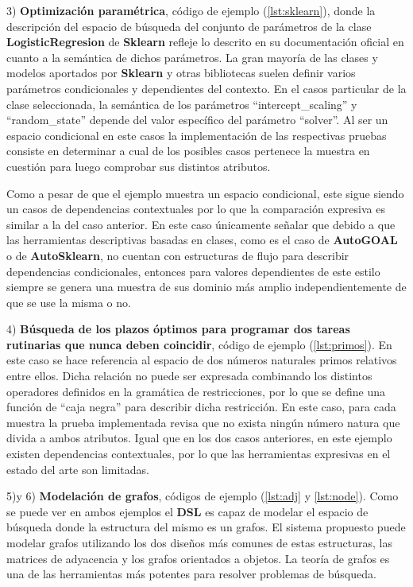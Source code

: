 3) {\bf Optimización paramétrica}, código de ejemplo (\ref{lst:sklearn}), donde la descripción del espacio de búsqueda del conjunto de parámetros de la clase
      {\bf LogisticRegresion} de {\bf Sklearn} refleje lo descrito en su documentación oficial en cuanto a la semántica de dichos
parámetros. La gran mayoría de las clases y modelos aportados por {\bf Sklearn} y otras bibliotecas suelen definir varios
parámetros condicionales y dependientes del contexto. En el casos particular de la clase seleccionada, la semántica
de los parámetros ``intercept_scaling'' y ``random_state'' depende del valor específico del parámetro ``solver''. Al ser
un espacio condicional en este casos la implementación de las respectivas pruebas consiste en determinar a cual de
los posibles casos pertenece la muestra en cuestión para luego comprobar sus distintos atributos.

Como a pesar de que el ejemplo muestra un espacio condicional, este sigue siendo un casos de dependencias contextuales
por lo que la comparación expresiva es similar a la del caso anterior. En este caso únicamente señalar que debido a que
las herramientas descriptivas basadas en clases, como es el caso de {\bf AutoGOAL} o de {\bf AutoSklearn}, no cuentan con estructuras
de flujo para describir dependencias condicionales, entonces para valores dependientes de este estilo siempre se genera
una muestra de sus dominio más amplio independientemente de que se use la misma o no.

4) {\bf Búsqueda de los plazos óptimos para programar dos tareas rutinarias que nunca deben coincidir}, código de ejemplo (\ref{lst:primos}). En este caso se hace
referencia al espacio de dos números naturales primos relativos entre ellos. Dicha relación no puede ser expresada
combinando los distintos operadores definidos en la gramática de restricciones, por lo que se define una función de
``caja negra'' para describir dicha restricción. En este caso, para cada muestra la prueba implementada revisa que no
exista ningún número natura que divida a ambos atributos. Igual que en los dos casos anteriores, en este ejemplo existen
dependencias contextuales, por lo que las herramientas expresivas en el estado del arte son limitadas.

5)y 6) {\bf Modelación de grafos}, códigos de ejemplo (\ref{lst:adj} y \ref{lst:node}). Como se puede ver en ambos ejemplos el {\bf DSL} es capaz de modelar el espacio de búsqueda donde
la estructura del mismo es un grafos. El sistema propuesto puede modelar grafos utilizando los dos diseños más comunes de
estas estructuras, las matrices de adyacencia y los grafos orientados a objetos. La teoría de grafos es una de las
herramientas más potentes para resolver problemas de búsqueda.

